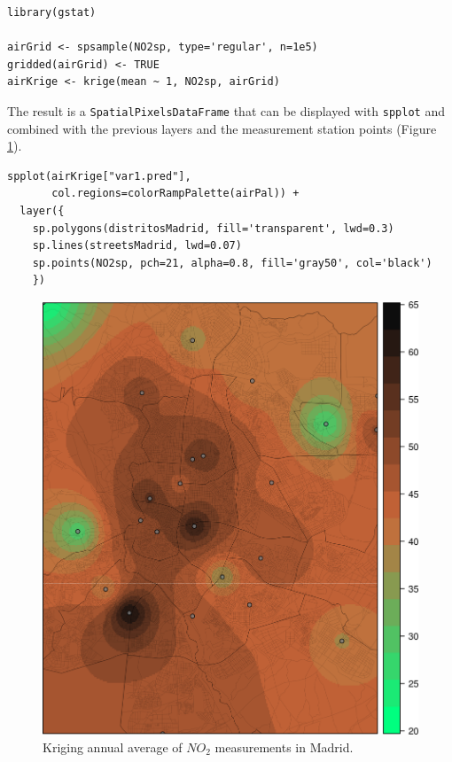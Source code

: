 \documentclass[smallroyalvopaper]{memoir}
\begin{document}

\lstset{language=R,numbers=none}
\begin{lstlisting}
library(gstat)

airGrid <- spsample(NO2sp, type='regular', n=1e5)
gridded(airGrid) <- TRUE
airKrige <- krige(mean ~ 1, NO2sp, airGrid)
\end{lstlisting}

The result is a \texttt{SpatialPixelsDataFrame} that can be displayed with
\texttt{spplot} and combined with the previous layers and the measurement
station points (Figure \ref{fig:airMadrid_krige}).


\lstset{language=R,numbers=none}
\begin{lstlisting}
spplot(airKrige["var1.pred"],
       col.regions=colorRampPalette(airPal)) +
  layer({
    sp.polygons(distritosMadrid, fill='transparent', lwd=0.3)
    sp.lines(streetsMadrid, lwd=0.07)
    sp.points(NO2sp, pch=21, alpha=0.8, fill='gray50', col='black')
    })
\end{lstlisting}

\begin{figure}[htb]
\centering
\includegraphics[width=.9\linewidth]{figs/airMadrid_krige.png}
\caption{\label{fig:airMadrid_krige}Kriging annual average of $NO_2$ measurements in Madrid.}
\end{figure}
\end{document}
